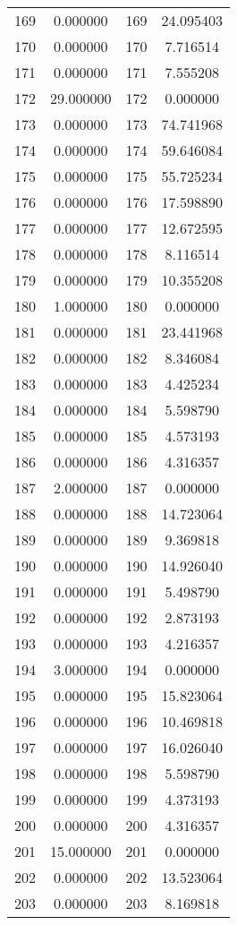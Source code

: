 \documentclass[12pt]{article}
\begin{document}
\begin{longtable}{@{}cccc@{}}
169 & 0.000000 & 169 & 24.095403 \\
170 & 0.000000 & 170 & 7.716514 \\
171 & 0.000000 & 171 & 7.555208 \\
172 & 29.000000 & 172 & 0.000000 \\
173 & 0.000000 & 173 & 74.741968 \\
174 & 0.000000 & 174 & 59.646084 \\
175 & 0.000000 & 175 & 55.725234 \\
176 & 0.000000 & 176 & 17.598890 \\
177 & 0.000000 & 177 & 12.672595 \\
178 & 0.000000 & 178 & 8.116514 \\
179 & 0.000000 & 179 & 10.355208 \\
180 & 1.000000 & 180 & 0.000000 \\
181 & 0.000000 & 181 & 23.441968 \\
182 & 0.000000 & 182 & 8.346084 \\
183 & 0.000000 & 183 & 4.425234 \\
184 & 0.000000 & 184 & 5.598790 \\
185 & 0.000000 & 185 & 4.573193 \\
186 & 0.000000 & 186 & 4.316357 \\
187 & 2.000000 & 187 & 0.000000 \\
188 & 0.000000 & 188 & 14.723064 \\
189 & 0.000000 & 189 & 9.369818 \\
190 & 0.000000 & 190 & 14.926040 \\
191 & 0.000000 & 191 & 5.498790 \\
192 & 0.000000 & 192 & 2.873193 \\
193 & 0.000000 & 193 & 4.216357 \\
194 & 3.000000 & 194 & 0.000000 \\
195 & 0.000000 & 195 & 15.823064 \\
196 & 0.000000 & 196 & 10.469818 \\
197 & 0.000000 & 197 & 16.026040 \\
198 & 0.000000 & 198 & 5.598790 \\
199 & 0.000000 & 199 & 4.373193 \\
200 & 0.000000 & 200 & 4.316357 \\
201 & 15.000000 & 201 & 0.000000 \\
202 & 0.000000 & 202 & 13.523064 \\
203 & 0.000000 & 203 & 8.169818 \\

\end{longtable}
\end{document}
